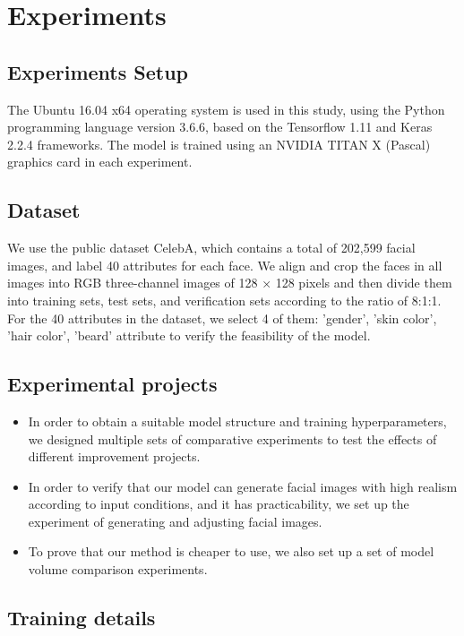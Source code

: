 \section{Experiments}

\subsection{Experiments Setup}
The Ubuntu 16.04 x64 operating system is used in this study, using the Python programming language version 3.6.6, based on the Tensorflow 1.11 and Keras 2.2.4 frameworks.
The model is trained using an NVIDIA TITAN X (Pascal) graphics card in each experiment.

\subsection{Dataset}
We use the public dataset CelebA, which contains a total of 202,599 facial images, and label 40 attributes for each face.
We align and crop the faces in all images into RGB three-channel images of 128 × 128 pixels and then divide them into training sets, test sets, and verification sets according to the ratio of 8:1:1.
For the 40 attributes in the dataset, we select 4 of them: 'gender', 'skin color', 'hair color', 'beard' attribute to verify the feasibility of the model.

\subsection{Experimental projects}
\begin{itemize}
\item In order to obtain a suitable model structure and training hyperparameters, we designed multiple sets of comparative experiments to test the effects of different improvement projects.
\item In order to verify that our model can generate facial images with high realism according to input conditions, and it has practicability, we set up the experiment of generating and adjusting facial images.
\item To prove that our method is cheaper to use, we also set up a set of model volume comparison experiments.
\end{itemize}

\subsection{Training details}

